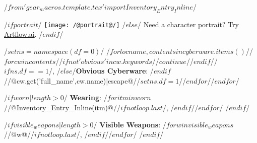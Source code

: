 /$from 'gear_macros.template.tex' import Inventory_Entry_Inline $/

/$if portrait$/
\texttt{[image: /@portrait@/]}
/$else$/
Need a character portrait? Try \href{artflow.ai}{Artflow.ai}.
/$endif$/


/$set ns=namespace(df=0)$/
/$for locname, contents in cyberware.items()$//$for cw in contents$//$if not 'obvious' in cw.keywords$//$continue$//$endif$//$if ns.df==1$/, /$else$/\textbf{Obvious Cyberware}: /$endif$//@cw.get('full_name',cw.name)|escape@//$set ns.df=1$//$endfor$//$endfor$/


/$if worn | length > 0$/
\textbf{Wearing}:
/$for itm in worn$//@Inventory_Entry_Inline(itm)@//$if not loop.last$/, /$endif$//$ endfor $/
\vspace*{8pt}
/$endif$/

/$if visible_weapons | length > 0$/
\textbf{Visible Weapons}:
/$for w in visible_weapons$//@w@//$if not loop.last$/, /$endif$//$endfor$/
/$endif$/